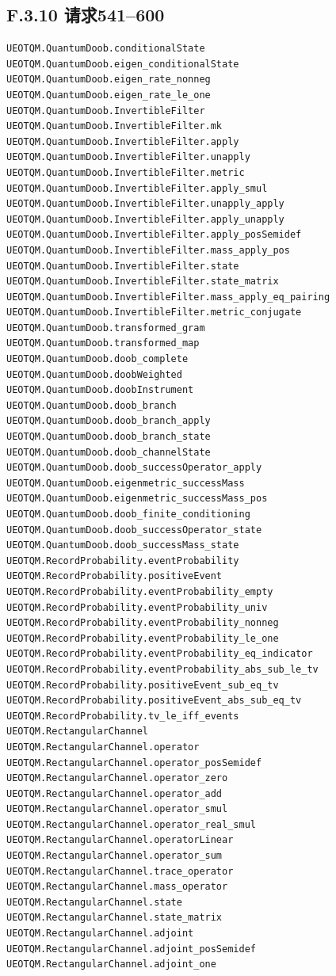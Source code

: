 \documentclass[
  11pt,
  oneside]{book}
\begin{document}
\hypertarget{f.3.10-ux8bf7ux6c42541600}{%
\subsection{F.3.10 请求541--600}\label{f.3.10-ux8bf7ux6c42541600}}

\begin{Verbatim}[breaklines,breakanywhere,fontsize=\scriptsize]
UEOTQM.QuantumDoob.conditionalState
UEOTQM.QuantumDoob.eigen_conditionalState
UEOTQM.QuantumDoob.eigen_rate_nonneg
UEOTQM.QuantumDoob.eigen_rate_le_one
UEOTQM.QuantumDoob.InvertibleFilter
UEOTQM.QuantumDoob.InvertibleFilter.mk
UEOTQM.QuantumDoob.InvertibleFilter.apply
UEOTQM.QuantumDoob.InvertibleFilter.unapply
UEOTQM.QuantumDoob.InvertibleFilter.metric
UEOTQM.QuantumDoob.InvertibleFilter.apply_smul
UEOTQM.QuantumDoob.InvertibleFilter.unapply_apply
UEOTQM.QuantumDoob.InvertibleFilter.apply_unapply
UEOTQM.QuantumDoob.InvertibleFilter.apply_posSemidef
UEOTQM.QuantumDoob.InvertibleFilter.mass_apply_pos
UEOTQM.QuantumDoob.InvertibleFilter.state
UEOTQM.QuantumDoob.InvertibleFilter.state_matrix
UEOTQM.QuantumDoob.InvertibleFilter.mass_apply_eq_pairing
UEOTQM.QuantumDoob.InvertibleFilter.metric_conjugate
UEOTQM.QuantumDoob.transformed_gram
UEOTQM.QuantumDoob.transformed_map
UEOTQM.QuantumDoob.doob_complete
UEOTQM.QuantumDoob.doobWeighted
UEOTQM.QuantumDoob.doobInstrument
UEOTQM.QuantumDoob.doob_branch
UEOTQM.QuantumDoob.doob_branch_apply
UEOTQM.QuantumDoob.doob_branch_state
UEOTQM.QuantumDoob.doob_channelState
UEOTQM.QuantumDoob.doob_successOperator_apply
UEOTQM.QuantumDoob.eigenmetric_successMass
UEOTQM.QuantumDoob.eigenmetric_successMass_pos
UEOTQM.QuantumDoob.doob_finite_conditioning
UEOTQM.QuantumDoob.doob_successOperator_state
UEOTQM.QuantumDoob.doob_successMass_state
UEOTQM.RecordProbability.eventProbability
UEOTQM.RecordProbability.positiveEvent
UEOTQM.RecordProbability.eventProbability_empty
UEOTQM.RecordProbability.eventProbability_univ
UEOTQM.RecordProbability.eventProbability_nonneg
UEOTQM.RecordProbability.eventProbability_le_one
UEOTQM.RecordProbability.eventProbability_eq_indicator
UEOTQM.RecordProbability.eventProbability_abs_sub_le_tv
UEOTQM.RecordProbability.positiveEvent_sub_eq_tv
UEOTQM.RecordProbability.positiveEvent_abs_sub_eq_tv
UEOTQM.RecordProbability.tv_le_iff_events
UEOTQM.RectangularChannel
UEOTQM.RectangularChannel.operator
UEOTQM.RectangularChannel.operator_posSemidef
UEOTQM.RectangularChannel.operator_zero
UEOTQM.RectangularChannel.operator_add
UEOTQM.RectangularChannel.operator_smul
UEOTQM.RectangularChannel.operator_real_smul
UEOTQM.RectangularChannel.operatorLinear
UEOTQM.RectangularChannel.operator_sum
UEOTQM.RectangularChannel.trace_operator
UEOTQM.RectangularChannel.mass_operator
UEOTQM.RectangularChannel.state
UEOTQM.RectangularChannel.state_matrix
UEOTQM.RectangularChannel.adjoint
UEOTQM.RectangularChannel.adjoint_posSemidef
UEOTQM.RectangularChannel.adjoint_one
\end{Verbatim}
\end{document}
